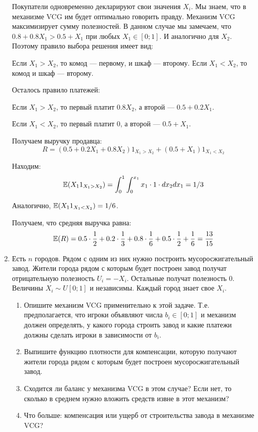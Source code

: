 \begin{enumerate}
Покупатели одновременно декларируют свои значения $ X_{i} $. Мы знаем, что в механизме VCG им будет оптимально говорить правду. Механизм VCG максимизирует сумму полезностей. В данном случае мы замечаем, что $ 0.8+0.8X_{1}>0.5+X_{1} $ при любых $ X_{1} \in [0;1]$. И аналогично для $ X_{2} $. Поэтому правило выбора решения имеет вид:

Если $ X_{1}>X_{2} $, то комод --- первому, и шкаф --- второму. Если $ X_{1}<X_{2} $, то комод и шкаф --- второму.

Осталось правило платежей:

Если $ X_{1}>X_{2} $, то первый платит $ 0.8X_{2} $, а второй --- $ 0.5+0.2X_{1} $.

Если $ X_{1}<X_{2} $, то первый платит 0, а второй --- $ 0.5+X_{1} $.

Получаем выручку продавца:
\begin{equation}
R=(0.5+0.2X_{1}+0.8X_{2})1_{X_{1}>X_{2}}+(0.5+X_{1})1_{X_{1}<X_{2}}
\end{equation}

Находим:
\begin{equation}
\mathbb{E}(X_{1}1_{X_{1}>X_{2}})=\int_{0}^{1}\int_{0}^{x_{1}}x_{1} \cdot 1 \cdot dx_{2}dx_{1}=1/3
\end{equation}

Аналогично, $ \mathbb{E}(X_{1}1_{X_{1}<X_{2}})=1/6 $.

Получаем, что средняя выручка равна:
\begin{equation}
\mathbb{E}(R)=0.5\cdot \frac{1}{2}+0.2\cdot \frac{1}{3}+0.8\cdot \frac{1}{6}+0.5\cdot \frac{1}{2}+\frac{1}{6}=\frac{13}{15}
\end{equation}

\item Есть $ n $ городов. Рядом с одним из них нужно построить мусоросжигательный завод. Жители города рядом с которым будет построен завод получат отрицательную полезность $ U_{i}=-X_{i} $. Остальные получат полезность 0. Величины $ X_{i}\sim U[0;1] $ и независимы. Каждый город знает свое $ X_{i} $. 
\begin{enumerate}
\item Опишите механизм VCG применительно к этой задаче. Т.е. предполагается, что игроки объявляют числа $ b_{i}\in [0;1] $ и механизм должен определять, у какого города строить завод и какие платежи должны сделать игроки в зависимости от $ b_{i} $.
\item Выпишите функцию плотности для компенсации, которую получают жители города рядом с которым будет построен мусоросжигательный завод.
\item Сходится ли баланс у механизма VCG в этом случае? Если нет, то сколько в среднем нужно вложить средств извне в этот механизм?
\item Что больше: компенсация или ущерб от строительства завода в механизме VCG?
\end{enumerate}


\end{enumerate}
